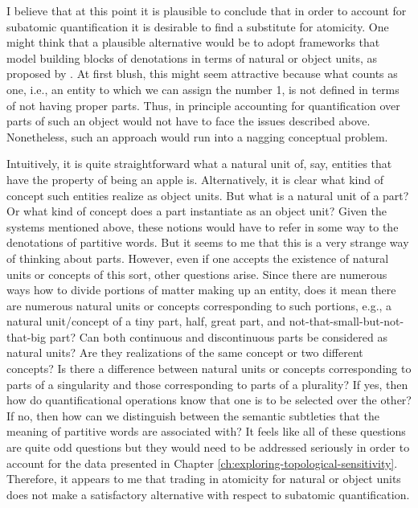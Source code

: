 	I believe that at this point it is plausible to conclude that in order to account for subatomic quantification it is desirable to find a substitute for atomicity. One might think that a plausible alternative would be to adopt frameworks that model building blocks of denotations in terms of natural or object units, as proposed by \citet{krifka1989nominal,krifka1995common}. At first blush, this might seem attractive because what counts as one, i.e., an entity to which we can assign the number 1, is not defined in terms of not having proper parts. Thus, in principle accounting for quantification over parts of such an object would not have to face the issues described above. Nonetheless, such an approach would run into a nagging conceptual problem.
	
	Intuitively, it is quite straightforward what a natural unit of, say, entities that have the property of being an apple is. Alternatively, it is clear what kind of concept such entities realize as object units. But what is a natural unit of a part? Or what kind of concept does a part instantiate as an object unit? Given the systems mentioned above, these notions would have to refer in some way to the denotations of partitive words. But it seems to me that this is a very strange way of thinking about parts. However, even if one accepts the existence of natural units or concepts of this sort, other questions arise. Since there are numerous ways how to divide portions of matter making up an entity, does it mean there are numerous natural units or concepts corresponding to such portions, e.g., a natural unit/concept of a tiny part, half, great part, and not-that-small-but-not-that-big part? Can both continuous and discontinuous parts be considered as natural units? Are they realizations of the same concept or two different concepts? Is there a difference between natural units or concepts corresponding to parts of a singularity and those corresponding to parts of a plurality? If yes, then how do quantificational operations know that one is to be selected over the other? If no, then how can we distinguish between the semantic subtleties that the meaning of partitive words are associated with? It feels like all of these questions are quite odd questions but they would need to be addressed seriously in order to account for the data presented in Chapter \ref{ch:exploring-topological-sensitivity}. Therefore, it appears to me that trading in atomicity for natural or object units does not make a satisfactory alternative with respect to subatomic quantification. 
	
